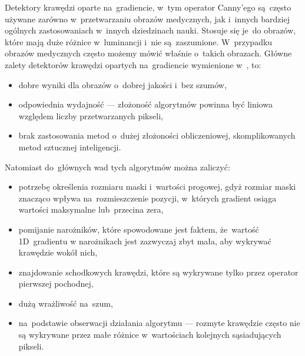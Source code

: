 \documentclass[a4paper,11pt,twoside,openright]{report}
\theoremstyle{definition}
\begin{document}
Detektory krawędzi oparte na~gradiencie, w~tym operator Canny'ego są~często używane
zarówno w~przetwarzaniu obrazów medycznych, jak i~innych bardziej ogólnych zastosowaniach
w~innych dziedzinach nauki. Stosuje się je~do obrazów, które mają duże różnice w~luminancji i~nie
są~zaszumione. W~przypadku obrazów medycznych często możemy mówić właśnie o~takich obrazach.
Główne zalety detektorów krawędzi opartych na~gradiencie
wymienione w~\cite{Cyfrowe przetwarzanie obrazów medycznych}, to:
\begin{itemize}[noitemsep]
\item dobre wyniki dla obrazów o~dobrej jakości i~bez szumów,
\item odpowiednia wydajność --- złożoność algorytmów powinna być liniowa względem liczby przetwarzanych pikseli,
\item brak zastosowania metod o~dużej złożoności obliczeniowej, skomplikowanych metod sztucznej inteligencji.
\end{itemize}

Natomiast do~głównych wad tych algorytmów można zaliczyć:
\begin{itemize}[noitemsep]
\item potrzebę określenia rozmiaru maski i~wartości progowej, gdyż rozmiar maski
znacząco wpływa na~rozmieszczenie pozycji, w~których gradient osiąga wartości
maksymalne lub~przecina zera,
\item pomijanie narożników, które spowodowane jest faktem, że~wartość 1D~gradientu
w narożnikach jest zazwyczaj zbyt mała, aby wykrywać krawędzie wokół nich,
\item znajdowanie schodkowych krawędzi, które są wykrywane tylko przez operator pierwszej pochodnej,
\item dużą wrażliwość na~szum,
\item na~podstawie obserwacji działania algorytmu --- rozmyte krawędzie często
nie są wykrywane przez małe różnice w~wartościach kolejnych sąsiadujących pikseli.
\end{itemize}
\end{document}
